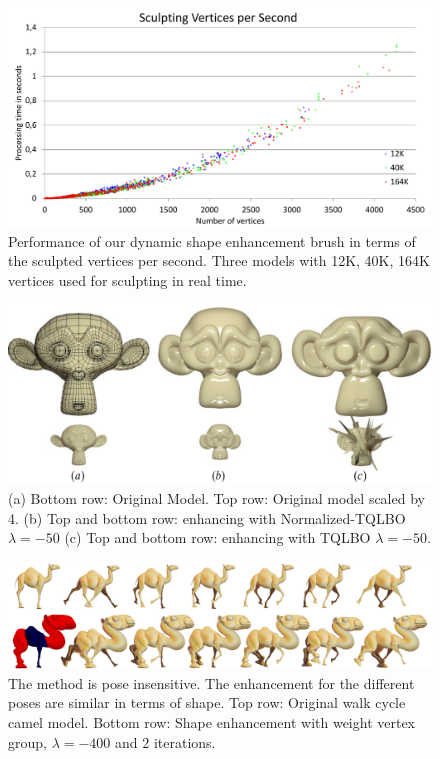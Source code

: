 \documentclass[10pt, conference]{IEEEtran}
\begin{document}
\begin{figure}
\includegraphics[width=1\columnwidth]{figs/verts_per_second_sculpt}

\caption{\label{fig:Performance-sculpt}Performance of our dynamic shape enhancement
brush in terms of the sculpted vertices per second. Three models with
12K, 40K, 164K vertices used for sculpting in real time.}
\end{figure}


\begin{figure}
\includegraphics[width=1\columnwidth]{figs/monkey}

\caption{\label{fig:(a)Monkey}(a) Bottom row: Original Model. Top row: Original
model scaled by 4. (b) Top and bottom row: enhancing with Normalized-TQLBO
$\lambda=-50$ (c) Top and bottom row: enhancing with TQLBO $\lambda=-50$.}
\end{figure}


\begin{figure}[t]
\includegraphics[width=1\textwidth]{figs/camello_walk2}

\caption{\label{fig:Animated_Camell}The method is pose insensitive. The enhancement
for the different poses are similar in terms of shape. Top row: Original
walk cycle camel model. Bottom row: Shape enhancement with weight
vertex group, $\lambda=-400$ and $2$ iterations. }
\end{figure}
\end{document}
